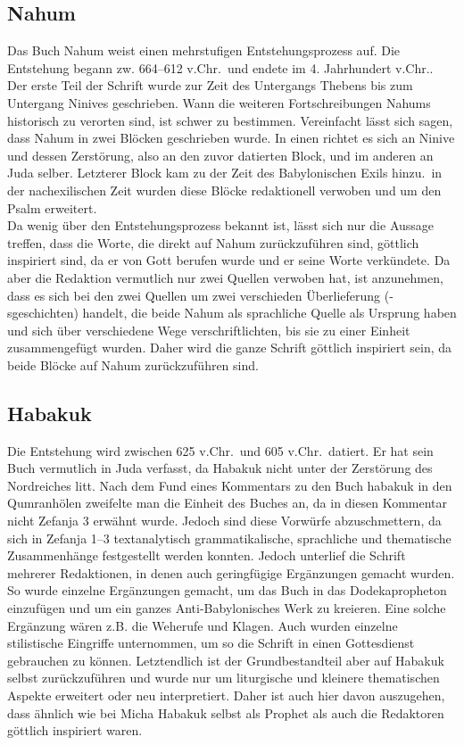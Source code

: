 \subsection*{Nahum}
Das Buch Nahum weist einen mehrstufigen Entstehungsprozess auf. Die Entstehung begann zw. 664--612 v.Chr.\ und endete im 4. Jahrhundert v.Chr.. Der erste Teil der Schrift wurde zur Zeit des Untergangs Thebens bis zum Untergang Ninives geschrieben. Wann die weiteren Fortschreibungen Nahums historisch zu verorten sind, ist schwer zu bestimmen. Vereinfacht lässt sich sagen, dass Nahum in zwei Blöcken geschrieben wurde. In einen richtet es sich an Ninive und dessen Zerstörung, also an den zuvor datierten Block, und im anderen an Juda selber. Letzterer Block kam zu der Zeit des Babylonischen Exils hinzu.\ in der nachexilischen Zeit wurden diese Blöcke redaktionell verwoben und um den Psalm erweitert.
\\
Da wenig über den Entstehungsprozess bekannt ist, lässt sich nur die Aussage treffen, dass die Worte, die direkt auf Nahum zurückzuführen sind, göttlich inspiriert sind, da er von Gott berufen wurde und er seine Worte verkündete. Da aber die Redaktion vermutlich nur zwei Quellen verwoben hat, ist anzunehmen, dass es sich bei den zwei Quellen um zwei verschieden Überlieferung (-sgeschichten) handelt, die beide Nahum als sprachliche Quelle als Ursprung haben und sich über verschiedene Wege verschriftlichten, bis sie zu einer Einheit zusammengefügt wurden. Daher wird die ganze Schrift göttlich inspiriert sein, da beide Blöcke auf Nahum zurückzuführen sind.

\subsection*{Habakuk}
Die Entstehung wird zwischen 625 v.Chr.\ und 605 v.Chr.\ datiert. Er hat sein Buch vermutlich in Juda verfasst, da Habakuk nicht unter der Zerstörung des Nordreiches litt. Nach dem Fund eines Kommentars zu den Buch habakuk in den Qumranhölen zweifelte man die Einheit des Buches an, da in diesen Kommentar nicht Zefanja 3 erwähnt wurde. Jedoch sind diese Vorwürfe abzuschmettern, da sich in Zefanja 1--3 textanalytisch grammatikalische, sprachliche und thematische Zusammenhänge festgestellt werden konnten. Jedoch unterlief die Schrift mehrerer Redaktionen, in denen auch geringfügige Ergänzungen gemacht wurden. So wurde einzelne Ergänzungen gemacht, um das Buch in das Dodekapropheton einzufügen und um ein ganzes Anti-Babylonisches Werk zu kreieren. Eine solche Ergänzung wären z.B. die Weherufe und Klagen. Auch wurden einzelne stilistische Eingriffe unternommen, um so die Schrift in einen Gottesdienst gebrauchen zu können. Letztendlich ist der Grundbestandteil aber auf Habakuk selbst zurückzuführen und wurde nur um liturgische und kleinere thematischen Aspekte erweitert oder neu interpretiert. Daher ist auch hier davon auszugehen, dass ähnlich wie bei Micha Habakuk selbst als Prophet als auch die Redaktoren göttlich inspiriert waren.

